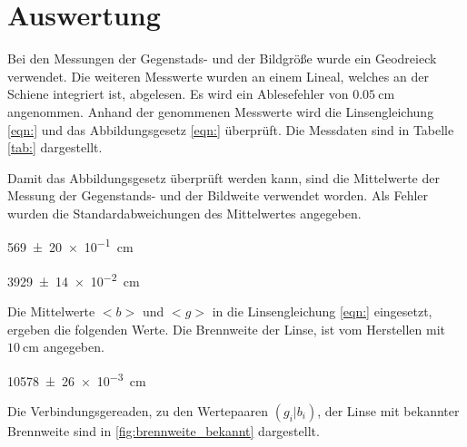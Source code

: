 



\section{Auswertung}

Bei den Messungen der Gegenstads- und der Bildgröße wurde ein Geodreieck verwendet.
Die weiteren Messwerte wurden an einem Lineal, welches an der Schiene integriert
ist, abgelesen. Es wird ein Ablesefehler von $\SI{0,05}{\centi\meter}$ angenommen.
Anhand der genommenen Messwerte wird die Linsengleichung \eqref{eqn:} und das
Abbildungsgesetz \eqref{eqn:} überprüft.
Die Messdaten sind in Tabelle \ref{tab:} dargestellt.

Damit das Abbildungsgesetz überprüft werden kann, sind die Mittelwerte der Messung
der Gegenstands- und der Bildweite verwendet worden. Als Fehler wurden die
Standardabweichungen des Mittelwertes angegeben.

\begin{description}
  \centering
  \item[$\frac{B}{G}=$]\SI{569(20)e-1}{\centi\meter}
  \item[$\frac{<b>}{<g>}=$]\SI{3929(14)e-2}{\centi\meter}
\end{description}

Die Mittelwerte $<b>$ und $<g>$ in die Linsengleichung \eqref{eqn:} eingesetzt,
ergeben die folgenden
Werte. Die Brennweite der Linse, ist vom Herstellen mit $\SI{10}{\centi\meter}$
angegeben.

\begin{description}
  \centering
  \item[$<f_1>\ua{gemessen}=$]\SI{10578(26)e-3}{\centi\meter}
\end{description}

Die Verbindungsgereaden, zu den Wertepaaren $(g_i|b_i)$, der Linse mit bekannter
Brennweite sind in \ref{fig:brennweite_bekannt}
dargestellt.

